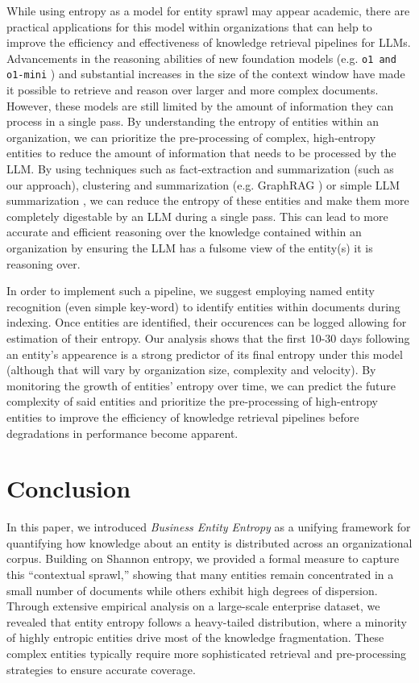 \documentclass[11pt,a4paper]{article}
\begin{document}
While using entropy as a model for entity sprawl may appear academic, there are practical applications for this model within organizations that can help to improve the efficiency and effectiveness of knowledge retrieval pipelines for LLMs. Advancements in the reasoning abilities of new foundation models (e.g. \texttt{o1 and o1-mini} \cite{openai2025o1}) and substantial increases in the size of the context window have made it possible to retrieve and reason over larger and more complex documents. However, these models are still limited by the amount of information they can process in a single pass. By understanding the entropy of entities within an organization, we can prioritize the pre-processing of complex, high-entropy entities to reduce the amount of information that needs to be processed by the LLM. By using techniques such as fact-extraction and summarization (such as our approach), clustering and summarization (e.g. GraphRAG \cite{edge2024localglobalgraphrag}) or simple LLM summarization \cite{basyal2023textsummarizationusinglarge}, we can reduce the entropy of these entities and make them more completely digestable by an LLM during a single pass. This can lead to more accurate and efficient reasoning over the knowledge contained within an organization by ensuring the LLM has a fulsome view of the entity(s) it is reasoning over.

In order to implement such a pipeline, we suggest employing named entity recognition (even simple key-word) to identify entities within documents during indexing. Once entities are identified, their occurences can be logged allowing for estimation of their entropy. Our analysis shows that the first 10-30 days following an entity's appearence is a strong predictor of its final entropy under this model (although that will vary by organization size, complexity and velocity). By monitoring the growth of entities' entropy over time, we can predict the future complexity of said entities and prioritize the pre-processing of high-entropy entities to improve the efficiency of knowledge retrieval pipelines before degradations in performance become apparent.

\FloatBarrier
\section{Conclusion}
\label{sec:conclusion}

In this paper, we introduced \emph{Business Entity Entropy} as a unifying framework for quantifying how knowledge about an entity is distributed across an organizational corpus. Building on Shannon entropy, we provided a formal measure to capture this ``contextual sprawl,'' showing that many entities remain concentrated in a small number of documents while others exhibit high degrees of dispersion. Through extensive empirical analysis on a large-scale enterprise dataset, we revealed that entity entropy follows a heavy-tailed distribution, where a minority of highly entropic entities drive most of the knowledge fragmentation. These complex entities typically require more sophisticated retrieval and pre-processing strategies to ensure accurate coverage.
\end{document}
